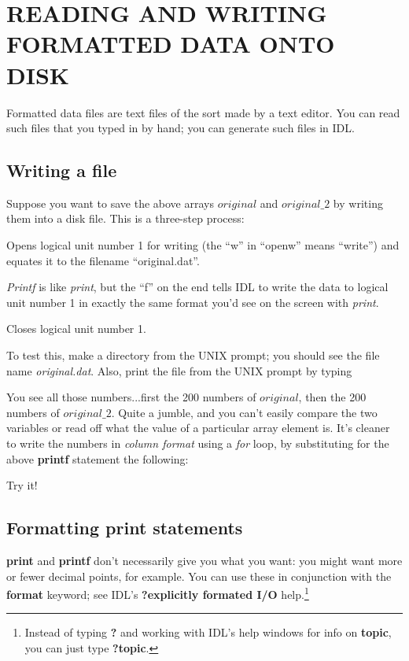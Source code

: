 \documentclass[psfig,preprint]{aastex}
\begin{document}
\section {READING AND WRITING FORMATTED DATA ONTO DISK}

	Formatted data files are text files of the sort made by a text
editor. You can read such files that you typed in by hand; you can
generate such files in IDL.

\subsection{Writing a file}

	Suppose you want to save the above arrays $original$ and
$original \_ 2$ by writing them into a disk file.  This is a three-step
process:

 Opens logical unit number 1 for
writing (the ``w'' in ``openw'' means ``write'') and equates it to the
filename ``original.dat''. 

 {\it Printf} is like
{\it print}, but the ``f'' on the end tells IDL to write the data to
logical unit number 1 in exactly the same format you'd see on the screen
with {\it print}. 

 Closes logical unit number 1.

	To test this, make a directory from the UNIX prompt; you should
see the file name {\it original.dat}.  Also, print the file from the
UNIX prompt by typing


\noindent You see all those numbers...first the 200 numbers of
$original$, then the 200 numbers of $original\_2$. Quite a jumble, and
you can't easily compare the two variables or read off what the value of
a particular array element is. It's cleaner to write the numbers in {\it
column format} using a {\it for} loop, by substituting for the above {\bf
printf} statement the following:


\noindent Try it!

\subsection{Formatting print statements}

	{\bf print} and {\bf printf} don't necessarily give you what you
want: you might want more or fewer decimal points, for example.  You can
use these in conjunction with the {\bf format} keyword; see IDL's {\bf
?explicitly formated I/O} help.\footnote{Instead of typing {\bf ?} and
working with IDL's help windows for info on {\bf topic}, you can just
type {\bf ?topic}.} 
\end{document}
